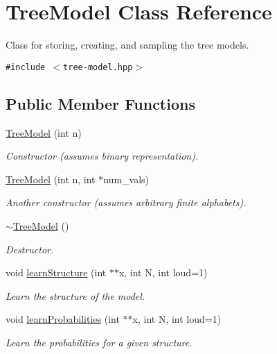 \hypertarget{class_tree_model}{
\section{Tree\-Model Class Reference}
\label{class_tree_model}
}
Class for storing, creating, and sampling the tree models.  


{\tt \#include $<$tree-model.hpp$>$}

\subsection*{Public Member Functions}
\begin{CompactItemize}
\item 
\hyperlink{class_tree_model_eabf8492e9e205ae30e49f53e0d9957d}{Tree\-Model} (int n)
\begin{CompactList}\small\item\em Constructor (assumes binary representation). \item\end{CompactList}\item 
\hyperlink{class_tree_model_c3f6a449478d5948af2b605f3dc99bb9}{Tree\-Model} (int n, int $\ast$num\_\-vals)
\begin{CompactList}\small\item\em Another constructor (assumes arbitrary finite alphabets). \item\end{CompactList}\item 
\hyperlink{class_tree_model_f0998d55a63c2b18be1f03e4e8567926}{$\sim$Tree\-Model} ()
\begin{CompactList}\small\item\em Destructor. \item\end{CompactList}\item 
void \hyperlink{class_tree_model_3b38e54adca6bff1c6ec8eeb05cc3f24}{learn\-Structure} (int $\ast$$\ast$x, int N, int loud=1)
\begin{CompactList}\small\item\em Learn the structure of the model. \item\end{CompactList}\item 
void \hyperlink{class_tree_model_8d2749fa4535b449b74e2a53e3ad0645}{learn\-Probabilities} (int $\ast$$\ast$x, int N, int loud=1)
\begin{CompactList}\small\item\em Learn the probabilities for a given structure. \item\end{CompactList}\item 

\end{CompactItemize}
